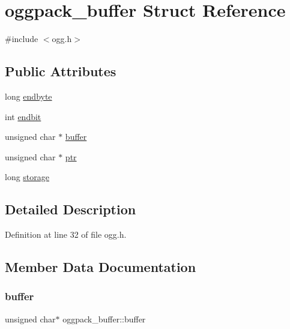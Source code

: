 \hypertarget{structoggpack__buffer}{}\section{oggpack\+\_\+buffer Struct Reference}
\label{structoggpack__buffer}


{\ttfamily \#include $<$ogg.\+h$>$}

\subsection*{Public Attributes}
\begin{DoxyCompactItemize}
\item 
long \mbox{\hyperlink{structoggpack__buffer_a416200dd77da3603dce3913826d74207}{endbyte}}
\item 
int \mbox{\hyperlink{structoggpack__buffer_a5a2ecb260025f73201e58dbd621c9f8b}{endbit}}
\item 
unsigned char $\ast$ \mbox{\hyperlink{structoggpack__buffer_a2d828a6e3d0a57f44debf56665ad402e}{buffer}}
\item 
unsigned char $\ast$ \mbox{\hyperlink{structoggpack__buffer_a479984d9646e0fba6da8aff21e5c3b64}{ptr}}
\item 
long \mbox{\hyperlink{structoggpack__buffer_a1eea2afb662c8080a902d224773fee4e}{storage}}
\end{DoxyCompactItemize}


\subsection{Detailed Description}


Definition at line 32 of file ogg.\+h.



\subsection{Member Data Documentation}
\mbox{\label{structoggpack__buffer_a2d828a6e3d0a57f44debf56665ad402e}} 
\subsubsection{\texorpdfstring{buffer}{buffer}}
{\footnotesize\ttfamily unsigned char$\ast$ oggpack\+\_\+buffer\+::buffer}



